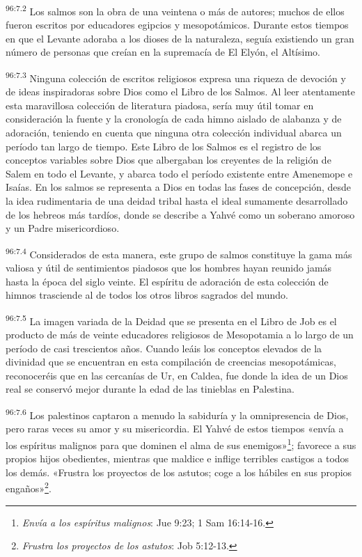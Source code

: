 \par
\textsuperscript{96:7.2} Los salmos son la obra de una veintena o más de autores; muchos de ellos fueron escritos por educadores egipcios y mesopotámicos. Durante estos tiempos en que el Levante adoraba a los dioses de la naturaleza, seguía existiendo un gran número de personas que creían en la supremacía de El Elyón, el Altísimo.

\par
\textsuperscript{96:7.3} Ninguna colección de escritos religiosos expresa una riqueza de devoción y de ideas inspiradoras sobre Dios como el Libro de los Salmos. Al leer atentamente esta maravillosa colección de literatura piadosa, sería muy útil tomar en consideración la fuente y la cronología de cada himno aislado de alabanza y de adoración, teniendo en cuenta que ninguna otra colección individual abarca un período tan largo de tiempo. Este Libro de los Salmos es el registro de los conceptos variables sobre Dios que albergaban los creyentes de la religión de Salem en todo el Levante, y abarca todo el período existente entre Amenemope e Isaías. En los salmos se representa a Dios en todas las fases de concepción, desde la idea rudimentaria de una deidad tribal hasta el ideal sumamente desarrollado de los hebreos más tardíos, donde se describe a Yahvé como un soberano amoroso y un Padre misericordioso.

\par
\textsuperscript{96:7.4} Considerados de esta manera, este grupo de salmos constituye la gama más valiosa y útil de sentimientos piadosos que los hombres hayan reunido jamás hasta la época del siglo veinte. El espíritu de adoración de esta colección de himnos trasciende al de todos los otros libros sagrados del mundo.

\par
\textsuperscript{96:7.5} La imagen variada de la Deidad que se presenta en el Libro de Job es el producto de más de veinte educadores religiosos de Mesopotamia a lo largo de un período de casi trescientos años. Cuando leáis los conceptos elevados de la divinidad que se encuentran en esta compilación de creencias mesopotámicas, reconoceréis que en las cercanías de Ur, en Caldea, fue donde la idea de un Dios real se conservó mejor durante la edad de las tinieblas en Palestina.

\par
\textsuperscript{96:7.6} Los palestinos captaron a menudo la sabiduría y la omnipresencia de Dios, pero raras veces su amor y su misericordia. El Yahvé de estos tiempos «envía a los espíritus malignos para que dominen el alma de sus enemigos»\footnote{\textit{Envía a los espíritus malignos}: Jue 9:23; 1 Sam 16:14-16.}; favorece a sus propios hijos obedientes, mientras que maldice e inflige terribles castigos a todos los demás. «Frustra los proyectos de los astutos; coge a los hábiles en sus propios engaños»\footnote{\textit{Frustra los proyectos de los astutos}: Job 5:12-13.}.

